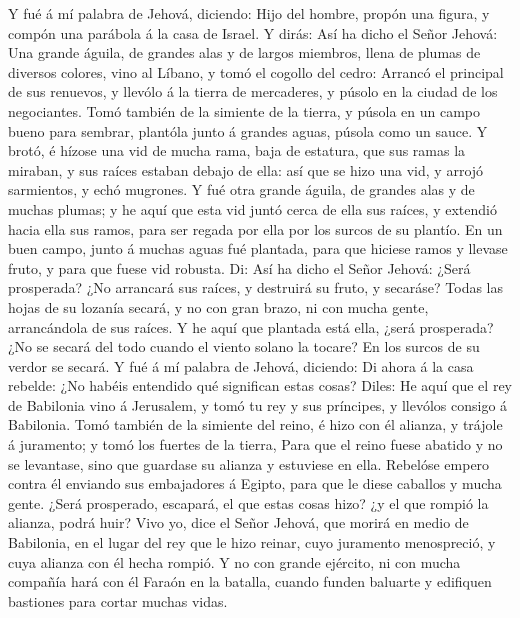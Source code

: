  Y fué á mí palabra de Jehová, diciendo:  Hijo
del hombre, propón una figura, y compón una parábola á la casa de
Israel.  Y dirás: Así ha dicho el Señor Jehová: Una grande
águila, de grandes alas y de largos miembros, llena de plumas de
diversos colores, vino al Líbano, y tomó el cogollo del cedro:
 Arrancó el principal de sus renuevos, y llevólo á la tierra
de mercaderes, y púsolo en la ciudad de los negociantes. 
Tomó también de la simiente de la tierra, y púsola en un campo bueno
para sembrar, plantóla junto á grandes aguas, púsola como un sauce.
 Y brotó, é hízose una vid de mucha rama, baja de estatura,
que sus ramas la miraban, y sus raíces estaban debajo de ella: así que
se hizo una vid, y arrojó sarmientos, y echó mugrones.  Y
fué otra grande águila, de grandes alas y de muchas plumas; y he aquí
que esta vid juntó cerca de ella sus raíces, y extendió hacia ella sus
ramos, para ser regada por ella por los surcos de su plantío.
 En un buen campo, junto á muchas aguas fué plantada, para
que hiciese ramos y llevase fruto, y para que fuese vid robusta.
 Di: Así ha dicho el Señor Jehová: ¿Será prosperada? ¿No
arrancará sus raíces, y destruirá su fruto, y secaráse? Todas las hojas
de su lozanía secará, y no con gran brazo, ni con mucha gente,
arrancándola de sus raíces.  Y he aquí que plantada está
ella, ¿será prosperada? ¿No se secará del todo cuando el viento solano
la tocare? En los surcos de su verdor se secará.  Y fué á
mí palabra de Jehová, diciendo:  Di ahora á la casa
rebelde: ¿No habéis entendido qué significan estas cosas? Diles: He aquí
que el rey de Babilonia vino á Jerusalem, y tomó tu rey y sus príncipes,
y llevólos consigo á Babilonia.  Tomó también de la
simiente del reino, é hizo con él alianza, y trájole á juramento; y tomó
los fuertes de la tierra,  Para que el reino fuese abatido
y no se levantase, sino que guardase su alianza y estuviese en ella.
 Rebelóse empero contra él enviando sus embajadores á
Egipto, para que le diese caballos y mucha gente. ¿Será prosperado,
escapará, el que estas cosas hizo? ¿y el que rompió la alianza, podrá
huir?  Vivo yo, dice el Señor Jehová, que morirá en medio
de Babilonia, en el lugar del rey que le hizo reinar, cuyo juramento
menospreció, y cuya alianza con él hecha rompió.  Y no con
grande ejército, ni con mucha compañía hará con él Faraón en la batalla,
cuando funden baluarte y edifiquen bastiones para cortar muchas vidas.
